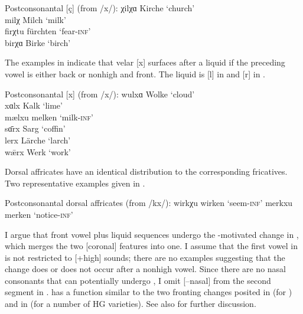\ea%
\label{ex:6:32}Postconsonantal [ç] (from /x/):
\ea\label{ex:6:32a} χilχɑ \tab       [çilçɑ]  \tab Kirche   \tab ‘church’            \\
    milχ        \tab [milç]   \tab Milch    \tab ‘milk’              \\
\ex\label{ex:6:32b} firχtu      \tab [firçtu] \tab fürchten \tab ‘fear-\textsc{inf}’ \\
    birχɑ \tab       [birçɑ]  \tab Birke    \tab ‘birch’             \\
   \z
\z 

The examples in  indicate that velar [x] surfaces after a liquid if the preceding vowel is either back or nonhigh and front. The liquid is [l] in  and [r] in .

\ea%
\label{ex:6:33}Postconsonantal [x] (from /x/):
\ea\label{ex:6:33a} wulxɑ \tab [wulxɑ] \tab Wolke  \tab ‘cloud’ \\
    xɑlx  \tab [xɑlx]  \tab Kalk   \tab ‘lime’  \\
    mælxu \tab [mælxu] \tab melken \tab  ‘milk-\textsc{inf}’ \\
\ex\label{ex:6:33b} sɑ̄rx      \tab [sɑːrx] \tab Sarg    \tab ‘coffin’ \\
    lerx      \tab [lerx]  \tab Lärche  \tab ‘larch’  \\
    w\={æ}rx  \tab [wæːrx] \tab Werk    \tab ‘work’   \\
    \z
\z 

Dorsal affricates have an identical distribution to the corresponding fricatives. Two representative examples given in .

\ea%
\label{ex:6:34}Postconsonantal dorsal affricates (from /kx/):
\ea\label{ex:6:34a} wirkχu \tab [wirkçu] \tab wirken \tab ‘seem\textsc{{}-inf}’ 
\ex\label{ex:6:34b} merkxu \tab [merkxu] \tab merken \tab ‘notice-\textsc{inf}’ 
\z
\z 

I argue that front vowel plus liquid sequences undergo the -motivated change in , which merges the two [coronal] features into one. I assume that the first vowel in  is not restricted to [+high] sounds; there are no examples suggesting that the change does or does not occur after a nonhigh vowel. Since there are no nasal consonants that can potentially undergo , I omit [--nasal] from the second segment in .  has a function similar to the two  fronting changes posited in  (for ) and in  (for a number of HG varieties). See also  for further discussion.

